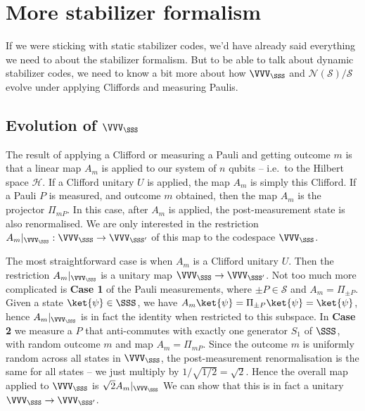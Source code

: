 \section{More stabilizer formalism}\label{sec:more-stabilizer-formalism}

If we were sticking with static stabilizer codes, we'd have already said everything we need to about the stabilizer formalism.
But to be able to talk about dynamic stabilizer codes, we need to know a bit more about how $\VVV_\SSS$ and $\mathcal{N(S)/S}$ evolve under applying Cliffords and measuring Paulis.

\subsection{Evolution of $\VVV_\SSS$}\label{subsec:evolution-of-codespace}

The result of applying a Clifford or measuring a Pauli and getting outcome $m$ is that a linear map $A_m$ is applied to our system of $n$ qubits -- i.e.\ to the Hilbert space $\mathcal{H}$.
If a Clifford unitary $U$ is applied, the map $A_m$ is simply this Clifford.
If a Pauli $P$ is measured, and outcome $m$ obtained, then the map $A_m$ is the projector $\Pi_{mP}$.
In this case, after $A_m$ is applied, the post-measurement state is also renormalised.
We are only interested in the restriction $A_m|_{\VVV_\SSS} : \VVV_\SSS \to \VVV_{\SSS'}$ of this map to the codespace $\VVV_\SSS$.


The most straightforward case is when $A_m$ is a Clifford unitary $U$.
Then the restriction $A_m|_{\VVV_\SSS}$ is a unitary map $\VVV_\SSS \to \VVV_{\SSS'}$.
Not too much more complicated is \textbf{Case 1} of the Pauli measurements, where $\pm P \in \mathcal{S}$ and $A_m = \Pi_{\pm P}$.
Given a state $\ket{\psi} \in \SSS$, we have $A_m \ket{\psi} = \Pi_{\pm P} \ket{\psi} = \ket{\psi}$, hence $A_m|_{\VVV_\SSS}$ is in fact the identity when restricted to this subspace.
In \textbf{Case 2} we measure a $P$ that anti-commutes with exactly one generator $S_1$ of $\SSS$, with random outcome $m$ and map $A_m = \Pi_{mP}$.
Since the outcome $m$ is uniformly random across all states in $\VVV_\SSS$, the post-measurement renormalisation is the same for all states -- we just multiply by $1/{\sqrt{1/2}} = \sqrt{2}$.
Hence the overall map applied to $\VVV_\SSS$ is $\sqrt{2} A_m|_{\VVV_\SSS}$
We can show that this is in fact a unitary $\VVV_\SSS \to \VVV_{\SSS'}$.

